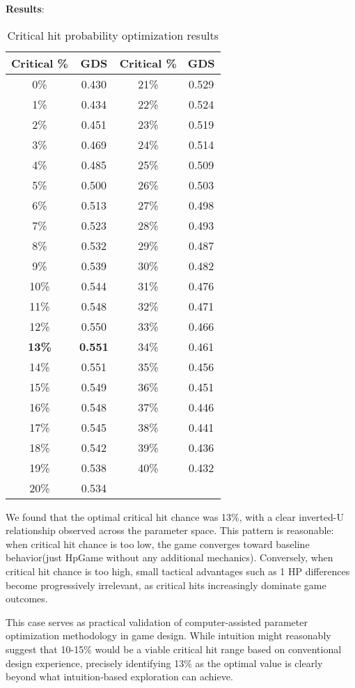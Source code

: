 \documentclass{article}
\begin{document}
\textbf{Results}:
\begin{table}[H]
\centering
\begin{tabular}{|c|c||c|c|}
\hline
Critical \% & GDS & Critical \% & GDS \\
\hline
0\% & 0.430 & 21\% & 0.529 \\
1\% & 0.434 & 22\% & 0.524 \\
2\% & 0.451 & 23\% & 0.519 \\
3\% & 0.469 & 24\% & 0.514 \\
4\% & 0.485 & 25\% & 0.509 \\
5\% & 0.500 & 26\% & 0.503 \\
6\% & 0.513 & 27\% & 0.498 \\
7\% & 0.523 & 28\% & 0.493 \\
8\% & 0.532 & 29\% & 0.487 \\
9\% & 0.539 & 30\% & 0.482 \\
10\% & 0.544 & 31\% & 0.476 \\
11\% & 0.548 & 32\% & 0.471 \\
12\% & 0.550 & 33\% & 0.466 \\
\textbf{13\%} & \textbf{0.551} & 34\% & 0.461 \\
14\% & 0.551 & 35\% & 0.456 \\
15\% & 0.549 & 36\% & 0.451 \\
16\% & 0.548 & 37\% & 0.446 \\
17\% & 0.545 & 38\% & 0.441 \\
18\% & 0.542 & 39\% & 0.436 \\
19\% & 0.538 & 40\% & 0.432 \\
20\% & 0.534 &  &  \\
\hline
\end{tabular}
\caption{Critical hit probability optimization results}
\end{table}

We found that the optimal critical hit chance was 13\%, with a clear inverted-U relationship observed across the parameter space. This pattern is reasonable: when critical hit chance is too low, the game converges toward baseline behavior(just HpGame without any additional mechanics). Conversely, when critical hit chance is too high, small tactical advantages such as 1 HP differences become progressively irrelevant, as critical hits increasingly dominate game outcomes.

This case serves as practical validation of computer-assisted parameter optimization methodology in game design.
While intuition might reasonably suggest that 10-15\% would be a viable critical hit range based on conventional design experience, precisely identifying 13\% as the optimal value is clearly beyond what intuition-based exploration can achieve.
\end{document}
